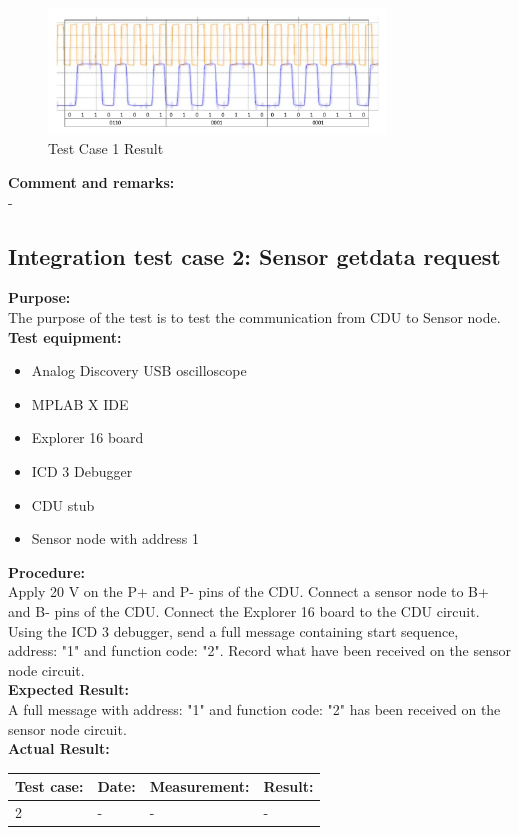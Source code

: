 \begin{figure}[H]
\centering
\includegraphics[width=0.8\textwidth]{billeder/CDUtestcase9}
\caption{Test Case 1 Result}
\label{fig:InteTestCase1}
\end{figure}

\textbf{Comment and remarks:}\\
-\\

\subsection{Integration test case 2: Sensor getdata request}
\textbf{Purpose:}\\
The purpose of the test is to test the communication from CDU to Sensor node.\\

\textbf{Test equipment:}
\begin{itemize}
\item Analog Discovery USB oscilloscope
\item MPLAB X IDE
\item Explorer 16 board
\item ICD 3 Debugger
\item CDU stub
\item Sensor node with address 1
\end{itemize}

\textbf{Procedure:}\\
Apply 20 V on the P+ and P- pins of the CDU. Connect a sensor node to B+ and B- pins of the CDU. Connect the Explorer 16 board to the CDU circuit. Using the ICD 3 debugger, send a full message containing start sequence, address: "1" and function code: "2". Record what have been received on the sensor node circuit.\\

\textbf{Expected Result:}\\
A full message with address: "1" and function code: "2" has been received on the sensor node circuit.\\

\textbf{Actual Result:}\\
\begin{table}[H]
\centering
\begin{tabular}{|p{2cm}|p{2cm}|p{3cm}|p{2cm}|}\hline
\textbf{Test case:} & \textbf{Date:} & \textbf{Measurement:} & \textbf{Result:} \\ \hline
2 & - & - & - \\ \hline
\end{tabular}
\end{table}


